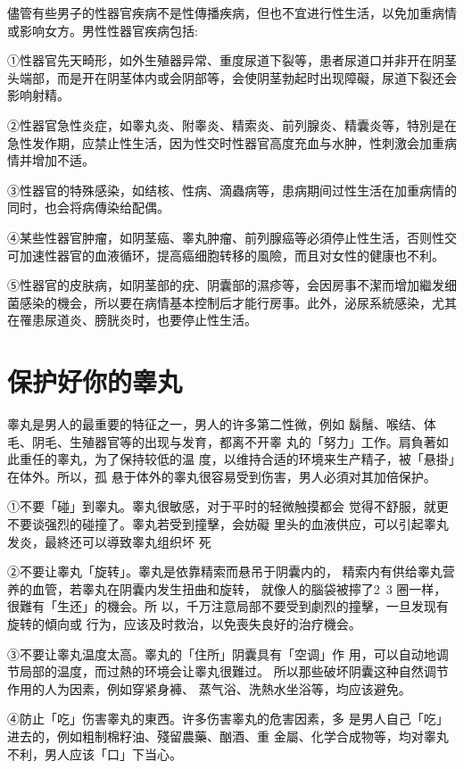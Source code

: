 \documentclass[12pt,UTF8]{ctexbook}
\begin{document}
儘管有些男子的性器官疾病不是性傳播疾病，但也不宜进行性生活，以免加重病情或影响女方。男性性器官疾病包括:

①性器官先天畸形，如外生殖器异常、重度尿道下裂等，患者尿道口并非开在阴茎头端部，而是开在阴茎体内或会阴部等，会使阴茎勃起时出现障礙，尿道下裂还会影响射精。

②性器官急性炎症，如睾丸炎、附睾炎、精索炎、前列腺炎、精囊炎等，特別是在急性发作期，应禁止性生活，因为性交时性器官高度充血与水肿，性刺激会加重病情并增加不适。

③性器官的特殊感染，如结核、性病、滴蟲病等，患病期间过性生活在加重病情的同时，也会将病傳染给配偶。

④某些性器官肿瘤，如阴茎癌、睾丸肿瘤、前列腺癌等必須停止性生活，否则性交可加速性器官的血液循环，提高癌细胞转移的風險，而且对女性的健康也不利。

⑤性器官的皮肤病，如阴茎部的疣、阴囊部的濕疹等，会因房事不潔而增加繼发细菌感染的機会，所以要在病情基本控制后才能行房事。此外，泌尿系統感染，尤其在罹患尿道炎、膀胱炎时，也要停止性生活。

\section{保护好你的睾丸}

睾丸是男人的最重要的特征之一，男人的许多第二性微，例如
鬍鬚、喉结、体毛、阴毛、生殖器官等的出现与发育，都离不开睾
丸的「努力」工作。肩負著如此重任的睾丸，为了保持较低的温
度，以维持合适的环境来生产精子，被「悬掛」在体外。所以，孤
悬于体外的睾丸很容易受到伤害，男人必須对其加倍保护。

①不要「碰」到睾丸。睾丸很敏感，对于平时的轻微触摸都会
觉得不舒服，就更不要谈强烈的碰撞了。睾丸若受到撞擊，会妨礙
里头的血液供应，可以引起睾丸发炎，最終还可以導致睾丸组织坏
死

②不要让睾丸「旋转」。睾丸是依靠精索而悬吊于阴囊内的，
精索内有供给睾丸营养的血管，若睾丸在阴囊内发生扭曲和旋转，
就像人的腦袋被擰了2~3 圈一样，很難有「生还」的機会。所
以，千万注意局部不要受到劇烈的撞擊，一旦发现有旋转的傾向或
行为，应该及时救治，以免喪失良好的治疗機会。

③不要让睾丸温度太高。睾丸的「住所」阴囊具有「空调」作
用，可以自动地调节局部的温度，而过熱的环境会让睾丸很難过。
所以那些破坏阴囊这种自然调节作用的人为因素，例如穿紧身褲、
蒸气浴、洗熱水坐浴等，均应该避免。

④防止「吃」伤害睾丸的東西。许多伤害睾丸的危害因素，多
是男人自己「吃」进去的，例如粗制棉籽油、殘留農藥、酗酒、重
金屬、化学合成物等，均对睾丸不利，男人应该「口」下当心。
\end{document}
